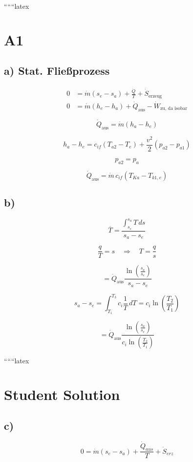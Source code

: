 
``````latex


\section*{A1}

\subsection*{a) Stat. Fließprozess}

\begin{align*}
0 &= \dot{m} (s_e - s_a) + \frac{\dot{Q}}{T} + \dot{S}_{\text{erzeug}} \\
0 &= \dot{m} (h_e - h_a) + \dot{Q}_{\text{aus}} - \dot{W}_{\text{zu, da isobar}}
\end{align*}

\[
\dot{Q}_{\text{aus}} = \dot{m} (h_a - h_e)
\]

\[
h_a - h_e = c_{if} (T_{a2} - T_{e}) + \frac{v^2}{2} (p_{a2} - p_{a1})
\]

\[
p_{a2} = p_a
\]

\[
\dot{Q}_{\text{aus}} = \dot{m} \, c_{if} (T_{Ka} - T_{k1,e})
\]

\subsection*{b)}

\[
\overline{T} = \frac{\int_{s_e}^{s_a} T \, ds}{s_a - s_e}
\]

\[
\frac{q}{T} = s \quad \Rightarrow \quad T = \frac{q}{s}
\]

\[
= \dot{Q}_{\text{aus}} \frac{\ln \left( \frac{s_a}{s_e} \right)}{s_a - s_e}
\]

\[
s_a - s_e = \int_{T_1}^{T_3} c_i \frac{1}{T} \, dT = c_i \ln \left( \frac{T_2}{T_1} \right)
\]

\[
= \dot{Q}_{\text{aus}} \frac{\ln \left( \frac{s_a}{s_e} \right)}{c_i \ln \left( \frac{T_2}{T_1} \right)}
\]

``````latex


\section*{Student Solution}

\subsection*{c)}

\begin{equation*}
0 = \dot{m}(s_e - s_a) + \frac{\dot{Q}_{aus}}{T} + \dot{S}_{erz}
\end{equation*}

